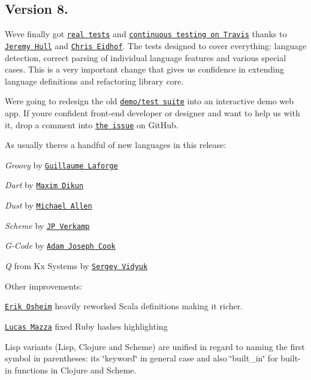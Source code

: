 \subsection*{Version 8.}

We\textquotesingle{}ve finally got \href{https://github.com/isagalaev/highlight.js/tree/master/test}{\tt real tests} and \href{https://travis-ci.org/isagalaev/highlight.js}{\tt continuous testing on Travis} thanks to \href{https://github.com/sourrust}{\tt Jeremy Hull} and \href{https://github.com/chriseidhof}{\tt Chris Eidhof}. The tests designed to cover everything\+: language detection, correct parsing of individual language features and various special cases. This is a very important change that gives us confidence in extending language definitions and refactoring library core.

We\textquotesingle{}re going to redesign the old \href{https://highlightjs.org/static/test.html}{\tt demo/test suite} into an interactive demo web app. If you\textquotesingle{}re confident front-\/end developer or designer and want to help us with it, drop a comment into \href{https://github.com/isagalaev/highlight.js/issues/542}{\tt the issue} on Git\+Hub.

As usually there\textquotesingle{}s a handful of new languages in this release\+:


\begin{DoxyItemize}
\item {\itshape Groovy} by \href{https://github.com/glaforge}{\tt Guillaume Laforge}
\item {\itshape Dart} by \href{https://github.com/dikmax}{\tt Maxim Dikun}
\item {\itshape Dust} by \href{https://github.com/bfui}{\tt Michael Allen}
\item {\itshape Scheme} by \href{https://github.com/jpverkamp}{\tt JP Verkamp}
\item {\itshape G-\/\+Code} by \href{https://github.com/adamjcook}{\tt Adam Joseph Cook}
\item {\itshape Q} from Kx Systems by \href{https://github.com/sv}{\tt Sergey Vidyuk}
\end{DoxyItemize}

Other improvements\+:


\begin{DoxyItemize}
\item \href{https://github.com/non}{\tt Erik Osheim} heavily reworked Scala definitions making it richer.
\item \href{https://github.com/lucasmazza}{\tt Lucas Mazza} fixed Ruby hashes highlighting
\item Lisp variants (Lisp, Clojure and Scheme) are unified in regard to naming the first symbol in parentheses\+: it\textquotesingle{}s \char`\"{}keyword\char`\"{} in general case and also \char`\"{}built\+\_\+in\char`\"{} for built-\/in functions in Clojure and Scheme.
\end{DoxyItemize}

